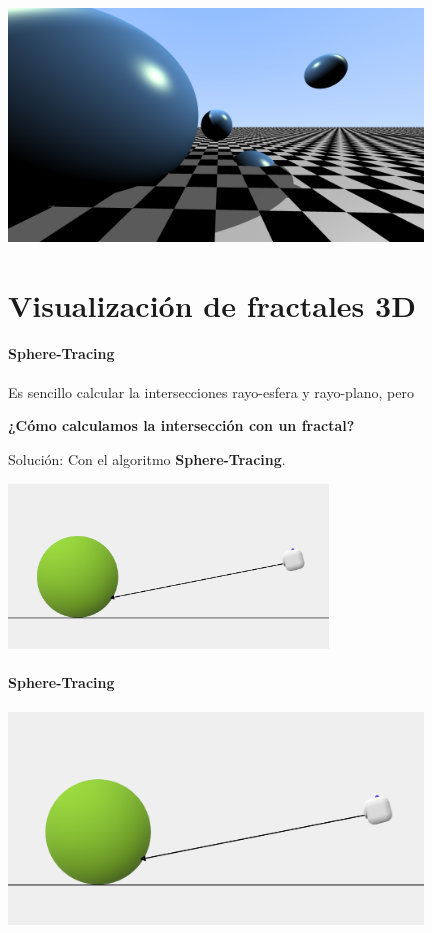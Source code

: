 \begin{frame}{\insertsectionhead}

\centering\includegraphics[width=11cm]{screenshots/imagen-final.png}
    
\end{frame}

\section{Visualización de fractales 3D}

\begin{frame}{\insertsectionhead}
\framesubtitle{Sphere-Tracing}
{\large

Es sencillo calcular la intersecciones rayo-esfera y rayo-plano, pero

\centering\textbf{¿Cómo calculamos la intersección con un fractal?}

\centering Solución: Con el algoritmo \textbf{Sphere-Tracing}.

\includegraphics[width=8.5cm]{screenshots/ST-1.png}

}
    
\end{frame}

\begin{frame}{\insertsectionhead}
\framesubtitle{Sphere-Tracing}

\centering\includegraphics[width=11cm]{screenshots/ST-1.png}
    
\end{frame}

